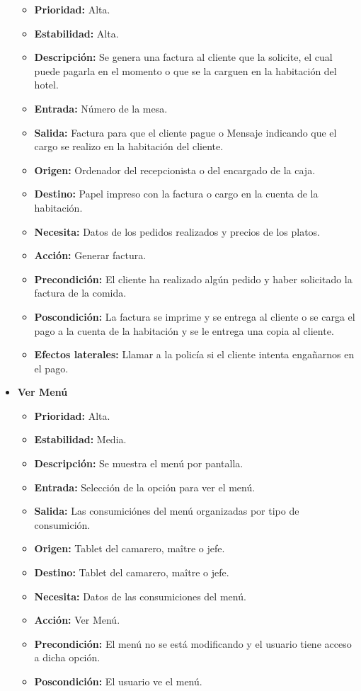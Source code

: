 \documentclass[spanish,a4paper,11pt, twoside]{report}	%
\begin{document}
\begin{itemize}
		\begin{itemize}
			\item \textbf{Prioridad: } Alta.
			\item \textbf{Estabilidad: } Alta.
			\item \textbf{Descripción: } Se genera una factura al cliente que la solicite, el cual puede pagarla en el momento o que se la carguen en la habitación del hotel.
			\item \textbf{Entrada: } Número de la mesa.
			\item \textbf{Salida: } Factura para que el cliente pague o Mensaje indicando que el cargo se realizo en la habitación del cliente.
			\item \textbf{Origen: } Ordenador del recepcionista o del encargado de la caja.
			\item \textbf{Destino: } Papel impreso con la factura o cargo en la cuenta de la habitación.
			\item \textbf{Necesita: } Datos de los pedidos realizados y precios de los platos.
			\item \textbf{Acción: } Generar factura.
			\item \textbf{Precondición: } El cliente ha realizado algún pedido y haber solicitado la factura de la comida.
			\item \textbf{Poscondición: } La factura se imprime y se entrega al cliente o se carga el pago a la cuenta de la habitación y se le entrega una copia al cliente.
			\item \textbf{Efectos laterales: } Llamar a la policía si el cliente intenta engañarnos en el pago.

		\end{itemize}%

	\item \textbf{Ver Menú} %

		\begin{itemize}
			\item \textbf{Prioridad: } Alta.
			\item \textbf{Estabilidad: } Media.
			\item \textbf{Descripción: } Se muestra el menú por pantalla.
			\item \textbf{Entrada: }Selección de la opción para ver el menú.
			\item \textbf{Salida: } Las consumiciónes del menú organizadas por tipo de consumición.
			\item \textbf{Origen: } Tablet del camarero, maître o jefe.
			\item \textbf{Destino: } Tablet del camarero, maître o jefe.
			\item \textbf{Necesita: } Datos de las consumiciones del menú.
			\item \textbf{Acción: } Ver Menú.
			\item \textbf{Precondición: } El menú no se está modificando y el usuario tiene acceso a dicha opción.
			\item \textbf{Poscondición: } El usuario ve el menú.



\end{itemize}
\end{itemize}
\end{document}
